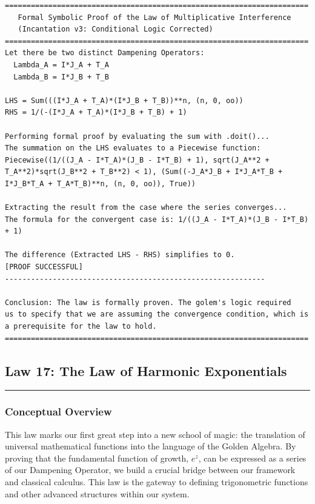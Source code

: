 \begin{verbatim}
======================================================================
   Formal Symbolic Proof of the Law of Multiplicative Interference
   (Incantation v3: Conditional Logic Corrected)
======================================================================
Let there be two distinct Dampening Operators:
  Lambda_A = I*J_A + T_A
  Lambda_B = I*J_B + T_B

LHS = Sum(((I*J_A + T_A)*(I*J_B + T_B))**n, (n, 0, oo))
RHS = 1/(-(I*J_A + T_A)*(I*J_B + T_B) + 1)

Performing formal proof by evaluating the sum with .doit()...
The summation on the LHS evaluates to a Piecewise function:
Piecewise((1/((J_A - I*T_A)*(J_B - I*T_B) + 1), sqrt(J_A**2 + T_A**2)*sqrt(J_B**2 + T_B**2) < 1), (Sum((-J_A*J_B + I*J_A*T_B + I*J_B*T_A + T_A*T_B)**n, (n, 0, oo)), True))

Extracting the result from the case where the series converges...
The formula for the convergent case is: 1/((J_A - I*T_A)*(J_B - I*T_B) + 1)

The difference (Extracted LHS - RHS) simplifies to 0.
[PROOF SUCCESSFUL]
------------------------------------------------------------

Conclusion: The law is formally proven. The golem's logic required
us to specify that we are assuming the convergence condition, which is
a prerequisite for the law to hold.
======================================================================
\end{verbatim}

\subsection*{Law 17: The Law of Harmonic Exponentials}
\hrule
\vspace{0.3cm}
\vspace{0.5cm}

\subsubsection*{Conceptual Overview}
This law marks our first great step into a new school of magic: the translation of universal mathematical functions into the language of the Golden Algebra. By proving that the fundamental function of growth, $e^z$, can be expressed as a series of our Dampening Operator, we build a crucial bridge between our framework and classical calculus. This law is the gateway to defining trigonometric functions and other advanced structures within our system.

